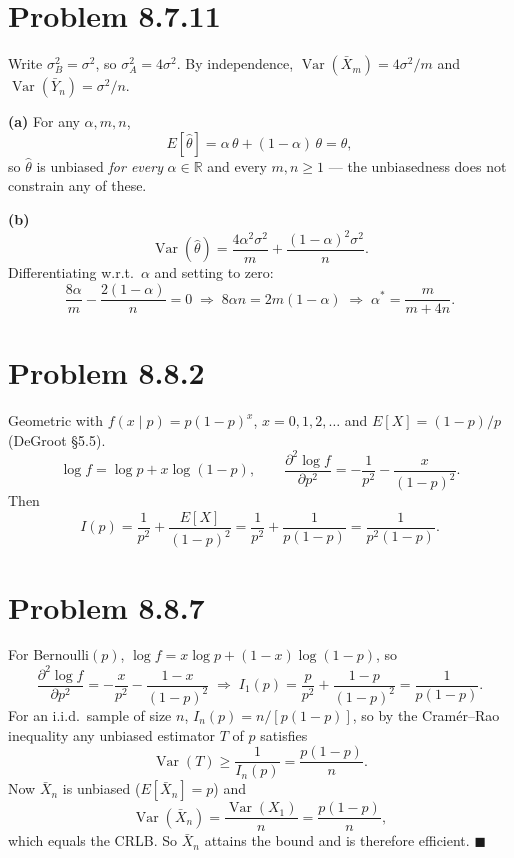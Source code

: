 \documentclass[11pt]{article}
\begin{document}
\section*{Problem 8.7.11}

Write $\sigma_B^2 = \sigma^2$, so $\sigma_A^2 = 4\sigma^2$. By independence, $\operatorname{Var}(\bar{X}_m) = 4\sigma^2/m$ and $\operatorname{Var}(\bar{Y}_n) = \sigma^2/n$.

\textbf{(a)} For any $\alpha, m, n$,
\[
E[\hat{\theta}] = \alpha\,\theta + (1-\alpha)\,\theta = \theta,
\]
so $\hat{\theta}$ is unbiased \emph{for every} $\alpha \in \mathbb{R}$ and every $m,n \ge 1$ --- the unbiasedness does not constrain any of these.

\textbf{(b)}
\[
\operatorname{Var}(\hat{\theta}) = \frac{4\alpha^2 \sigma^2}{m} + \frac{(1-\alpha)^2\sigma^2}{n}.
\]
Differentiating w.r.t.\ $\alpha$ and setting to zero:
\[
\frac{8\alpha}{m} - \frac{2(1-\alpha)}{n} = 0
\;\Longrightarrow\;
8\alpha n = 2m(1-\alpha)
\;\Longrightarrow\;
\boxed{\alpha^* = \frac{m}{m + 4n}.}
\]

\section*{Problem 8.8.2}

Geometric with $f(x \mid p) = p(1-p)^x$, $x = 0,1,2,\dots$ and $E[X] = (1-p)/p$ (DeGroot \S5.5).
\[
\log f = \log p + x\log(1-p),
\qquad
\frac{\partial^2 \log f}{\partial p^2} = -\frac{1}{p^2} - \frac{x}{(1-p)^2}.
\]
Then
\[
I(p) = \frac{1}{p^2} + \frac{E[X]}{(1-p)^2}
= \frac{1}{p^2} + \frac{1}{p(1-p)}
= \boxed{\frac{1}{p^2(1-p)}.}
\]

\section*{Problem 8.8.7}

For Bernoulli$(p)$, $\log f = x\log p + (1-x)\log(1-p)$, so
\[
\frac{\partial^2 \log f}{\partial p^2} = -\frac{x}{p^2} - \frac{1-x}{(1-p)^2}
\;\Longrightarrow\;
I_1(p) = \frac{p}{p^2} + \frac{1-p}{(1-p)^2} = \frac{1}{p(1-p)}.
\]
For an i.i.d.\ sample of size $n$, $I_n(p) = n/[p(1-p)]$, so by the Cram\'er--Rao inequality any unbiased estimator $T$ of $p$ satisfies
\[
\operatorname{Var}(T) \ge \frac{1}{I_n(p)} = \frac{p(1-p)}{n}.
\]
Now $\bar{X}_n$ is unbiased ($E[\bar{X}_n] = p$) and
\[
\operatorname{Var}(\bar{X}_n) = \frac{\operatorname{Var}(X_1)}{n} = \frac{p(1-p)}{n},
\]
which equals the CRLB. So $\bar{X}_n$ attains the bound and is therefore efficient. \hfill $\blacksquare$
\end{document}
